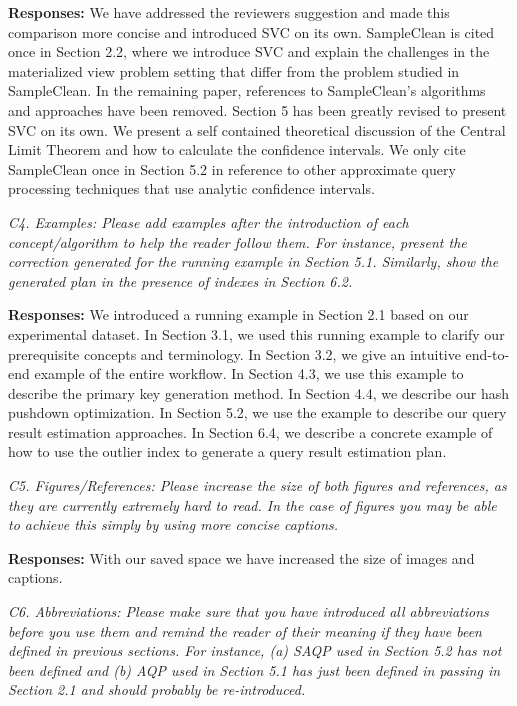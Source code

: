 {\bf Responses:} We have addressed the reviewers suggestion and made this comparison more concise and introduced SVC on its own. SampleClean is cited once in Section 2.2, where we introduce SVC and explain the challenges in the materialized view problem setting that differ from the problem studied in SampleClean. In the remaining paper, references to SampleClean’s algorithms and approaches have been removed. Section 5 has been greatly revised to present SVC on its own. We present a self contained theoretical discussion of the Central Limit Theorem and how to calculate the confidence intervals. We only cite SampleClean once in Section 5.2 in reference to other approximate query processing techniques that use analytic confidence intervals.

\vspace{1em}
\emph{C4. Examples: Please add examples after the introduction of each concept/algorithm to help the reader follow them. For instance, present the correction generated for the running example in Section 5.1. Similarly, show the generated plan in the presence of indexes in Section 6.2.}

\vspace{.25em}

{\bf Responses:} We introduced a running example in Section 2.1 based on our experimental dataset. In Section 3.1, we used this running example to clarify our prerequisite concepts and terminology. In Section 3.2, we give an intuitive end-to-end example of the entire workflow. In Section 4.3, we use this example to describe the primary key generation method. In Section 4.4, we describe our hash pushdown optimization. In Section 5.2, we use the example to describe our query result estimation approaches.  In Section 6.4, we describe a concrete example of how to use the outlier index to generate a query result estimation plan.

\vspace{1em}
\emph{C5. Figures/References: Please increase the size of both figures and references, as they are currently extremely hard to read. In the case of figures you may be able to achieve this simply by using more concise captions.}

\vspace{.25em}

{\bf Responses:} With our saved space we have increased the size of images and captions.

\vspace{1em}
\emph{C6. Abbreviations: Please make sure that you have introduced all abbreviations before you use them and remind the reader of their meaning if they have been defined in previous sections. For instance, (a) SAQP used in Section 5.2 has not been defined and (b) AQP used in Section 5.1 has just been defined in passing in Section 2.1 and should probably be re-introduced.}

